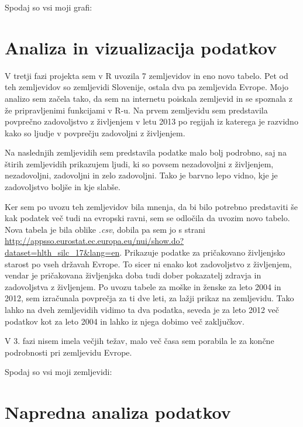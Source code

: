 \documentclass[11pt,a4paper]{article}
\begin{document}
Spodaj so vsi moji grafi:



\section{Analiza in vizualizacija podatkov}

V tretji fazi projekta sem v R uvozila 7 zemljevidov in eno novo tabelo. Pet od teh zemljevidov so zemljevidi Slovenije, ostala dva pa zemljevida Evrope. Mojo analizo sem začela tako, da sem na internetu poiskala zemljevid in se spoznala z že pripravljenimi funkcijami v R-u. Na prvem zemljevidu sem predstavila povprečno zadovoljstvo z življenjem v letu 2013 po regijah iz katerega je razvidno kako so ljudje v povprečju zadovoljni z življenjem.

Na naslednjih zemljevidih sem predstavila podatke malo bolj podrobno, saj na štirih zemljevidih prikazujem ljudi, ki so povsem nezadovoljni z življenjem, nezadovoljni, zadovoljni in zelo zadovoljni. Tako je barvno lepo vidno, kje je zadovoljstvo boljše in kje slabše.

Ker sem po uvozu teh zemljevidov bila mnenja, da bi bilo potrebno predstaviti še kak podatek več tudi na evropski ravni, sem se odločila da uvozim novo tabelo. Nova tabela je bila oblike \textit{.csv}, dobila pa sem jo s strani \url{http://appsso.eurostat.ec.europa.eu/nui/show.do?dataset=hlth_silc_17&lang=en}. Prikazuje podatke za pričakovano življenjsko starost po vseh državah Evrope. To sicer ni enako kot zadovoljstvo z življenjem, vendar je pričakovana življenjska doba tudi dober pokazatelj zdravja in zadovoljstva z življenjem. Po uvozu tabele za moške in ženske za leto 2004 in 2012, sem izračunala povprečja za ti dve leti, za lažji prikaz na zemljevidu.  Tako lahko na dveh zemljevidih vidimo ta dva podatka, seveda je za leto 2012 več podatkov kot za leto 2004 in lahko iz njega dobimo več zaključkov.

V 3. fazi nisem imela večjih težav, malo več časa sem porabila le za končne podrobnosti pri zemljevidu Evrope.

Spodaj so vsi moji zemljevidi:





\section{Napredna analiza podatkov}

\end{document}
